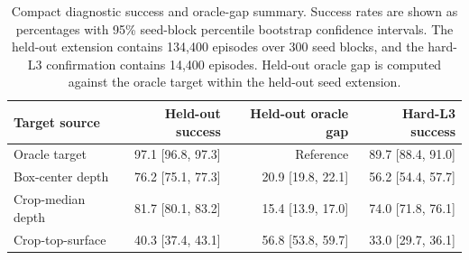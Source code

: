 \begin{table}[t]
\centering
\caption{Compact diagnostic success and oracle-gap summary. Success rates are shown as percentages with 95\% seed-block percentile bootstrap confidence intervals. The held-out extension contains 134,400 episodes over 300 seed blocks, and the hard-L3 confirmation contains 14,400 episodes. Held-out oracle gap is computed against the oracle target within the held-out seed extension.}
\label{tab:main-diagnostic-summary}
\footnotesize
\setlength{\tabcolsep}{3pt}
\begin{tabular}{lrrr}
\toprule
Target source & Held-out success & Held-out oracle gap & Hard-L3 success \\
\midrule
Oracle target & 97.1 [96.8, 97.3] & Reference & 89.7 [88.4, 91.0] \\
Box-center depth & 76.2 [75.1, 77.3] & 20.9 [19.8, 22.1] & 56.2 [54.4, 57.7] \\
Crop-median depth & 81.7 [80.1, 83.2] & 15.4 [13.9, 17.0] & 74.0 [71.8, 76.1] \\
Crop-top-surface & 40.3 [37.4, 43.1] & 56.8 [53.8, 59.7] & 33.0 [29.7, 36.1] \\
\bottomrule
\end{tabular}
\end{table}

